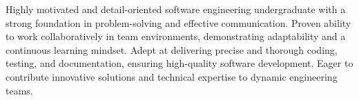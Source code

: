 

\begin{cvparagraph}

Highly motivated and detail-oriented software engineering undergraduate with a strong foundation in problem-solving and effective communication. Proven ability to work collaboratively in team environments, demonstrating adaptability and a continuous learning mindset. Adept at delivering precise and thorough coding, testing, and documentation, ensuring high-quality software development. Eager to contribute innovative solutions and technical expertise to dynamic engineering teams.
\end{cvparagraph}
